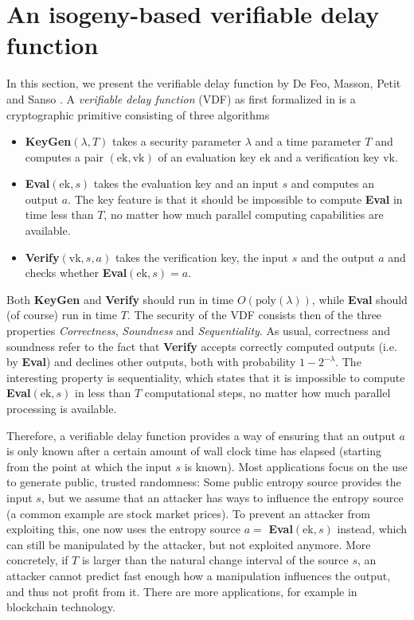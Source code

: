 \section{An isogeny-based verifiable delay function}
\label{sec:verifiable_delay_function}
In this section, we present the verifiable delay function by De Feo, Masson, Petit and Sanso \cite{verifiable_delay_function}.
A \emph{verifiable delay function} (VDF) as first formalized in \cite{definition_verifiable_delay_function} is a cryptographic primitive consisting of three algorithms
\begin{itemize}
    \item \textbf{KeyGen}$(\lambda, T)$ takes a security parameter $\lambda$ and a time parameter $T$ and computes a pair $(\mathrm{ek}, \mathrm{vk})$ of an evaluation key $\mathrm{ek}$ and a verification key $\mathrm{vk}$.
    \item \textbf{Eval}$(\mathrm{ek}, s)$ takes the evaluation key and an input $s$ and computes an output $a$. 
    The key feature is that it should be impossible to compute \textbf{Eval} in time less than $T$, no matter how much parallel computing capabilities are available.
    \item \textbf{Verify}$(\mathrm{vk}, s, a)$ takes the verification key, the input $s$ and the output $a$ and checks whether \textbf{Eval}$(\mathrm{ek}, s) = a$.
\end{itemize}
Both \textbf{KeyGen} and \textbf{Verify} should run in time $O(\mathrm{poly}(\lambda))$, while \textbf{Eval} should (of course) run in time $T$.
The security of the VDF consists then of the three properties \emph{Correctness}, \emph{Soundness} and \emph{Sequentiality}.
As usual, correctness and soundness refer to the fact that \textbf{Verify} accepts correctly computed outputs (i.e. by \textbf{Eval}) and declines other outputs, both with probability $1 - 2^{-\lambda}$.
The interesting property is sequentiality, which states that it is impossible to compute \textbf{Eval}$(\mathrm{ek}, s)$ in less than $T$ computational steps, no matter how much parallel processing is available.

Therefore, a verifiable delay function provides a way of ensuring that an output $a$ is only known after a certain amount of wall clock time has elapsed (starting from the point at which the input $s$ is known).
Most applications focus on the use to generate public, trusted randomness: Some public entropy source provides the input $s$, but we assume that an attacker has ways to influence the entropy source (a common example are stock market prices).
To prevent an attacker from exploiting this, one now uses the entropy source $a = $ \textbf{Eval}$(\mathrm{ek}, s)$ instead, which can still be manipulated by the attacker, but not exploited anymore.
More concretely, if $T$ is larger than the natural change interval of the source $s$, an attacker cannot predict fast enough how a manipulation influences the output, and thus not profit from it.
There are more applications, for example in blockchain technology.

